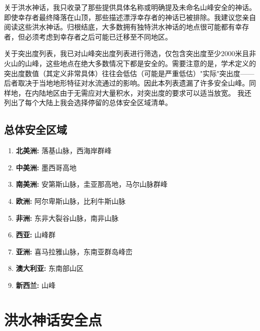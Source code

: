 \documentclass[10pt,twocolumn,letterpaper]{article}
\begin{document}
关于洪水神话，我只收录了那些提供具体名称或明确提及未命名山峰安全的神话。即使幸存者最终降落在山顶，那些描述漂浮幸存者的神话已被排除。我建议您亲自阅读这些洪水神话。归根结底，大多数拥有独特洪水神话的地点很可能都有幸存者，但必须考虑到幸存者之后可能已迁移至不同地区。

关于突出度列表，我已对山峰突出度列表进行筛选，仅包含突出度至少2000米且非火山的山峰，这些地点在绝大多数情况下都是安全的。需要注意的是，学术定义的突出度数值（其定义非常具体）往往会低估（可能是严重低估）"实际"突出度——后者取决于当地地形特征对水流通过的影响。因此本列表遗漏了许多安全山峰。同样地，在内陆地区由于无需应对大量积水，对突出度的要求可以适当放宽。
我还列出了每个大陆上我会选择停留的总体安全区域清单。

\subsection{总体安全区域}
\begin{flushleft}
\begin{enumerate}
    \item \textbf{北美洲:} 落基山脉，西海岸群峰
    \item \textbf{中美洲:} 墨西哥高地
    \item \textbf{南美洲:} 安第斯山脉，圭亚那高地，马尔山脉群峰
    \item \textbf{欧洲:} 阿尔卑斯山脉，比利牛斯山脉
    \item \textbf{非洲:} 东非大裂谷山脉，南非山脉
    \item \textbf{西亚:} 山峰群
    \item \textbf{亚洲:} 喜马拉雅山脉，东南亚群岛峰峦
    \item \textbf{澳大利亚:} 东南部山区
    \item \textbf{新西兰:} 山峰
\end{enumerate}
\end{flushleft}

\clearpage
\twocolumn

\section{洪水神话安全点}
\end{document}
